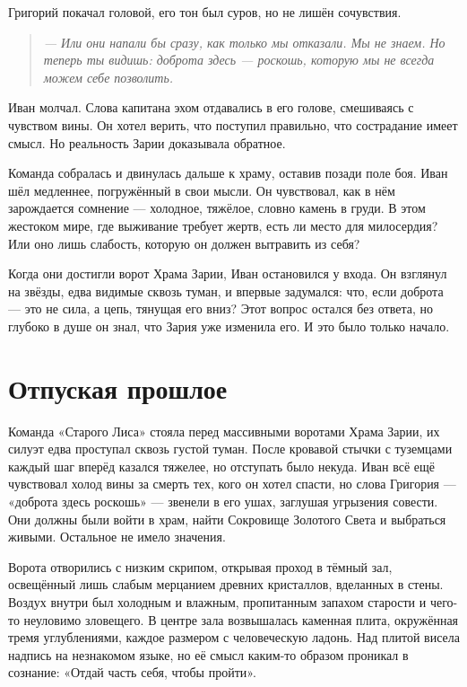 \documentclass[12pt,a4paper]{book}
\newenvironment{dialogue}{\begin{quote}\itshape}{\end{quote}}
\begin{document}
Григорий покачал головой, его тон был суров, но не лишён сочувствия.

\begin{dialogue}
--- Или они напали бы сразу, как только мы отказали. Мы не знаем. Но теперь ты видишь: доброта здесь --- роскошь, которую мы не всегда можем себе позволить.
\end{dialogue}

Иван молчал. Слова капитана эхом отдавались в его голове, смешиваясь с чувством вины. Он хотел верить, что поступил правильно, что сострадание имеет смысл. Но реальность Зарии доказывала обратное.

Команда собралась и двинулась дальше к храму, оставив позади поле боя. Иван шёл медленнее, погружённый в свои мысли. Он чувствовал, как в нём зарождается сомнение --- холодное, тяжёлое, словно камень в груди. В этом жестоком мире, где выживание требует жертв, есть ли место для милосердия? Или оно лишь слабость, которую он должен вытравить из себя?

Когда они достигли ворот Храма Зарии, Иван остановился у входа. Он взглянул на звёзды, едва видимые сквозь туман, и впервые задумался: что, если доброта --- это не сила, а цепь, тянущая его вниз? Этот вопрос остался без ответа, но глубоко в душе он знал, что Зария уже изменила его. И это было только начало.

\chapter{Отпуская прошлое}

Команда «Старого Лиса» стояла перед массивными воротами Храма Зарии, их силуэт едва проступал сквозь густой туман. После кровавой стычки с туземцами каждый шаг вперёд казался тяжелее, но отступать было некуда. Иван всё ещё чувствовал холод вины за смерть тех, кого он хотел спасти, но слова Григория --- «доброта здесь роскошь» --- звенели в его ушах, заглушая угрызения совести. Они должны были войти в храм, найти Сокровище Золотого Света и выбраться живыми. Остальное не имело значения.

Ворота отворились с низким скрипом, открывая проход в тёмный зал, освещённый лишь слабым мерцанием древних кристаллов, вделанных в стены. Воздух внутри был холодным и влажным, пропитанным запахом старости и чего-то неуловимо зловещего. В центре зала возвышалась каменная плита, окружённая тремя углублениями, каждое размером с человеческую ладонь. Над плитой висела надпись на незнакомом языке, но её смысл каким-то образом проникал в сознание: «Отдай часть себя, чтобы пройти».
\end{document}
